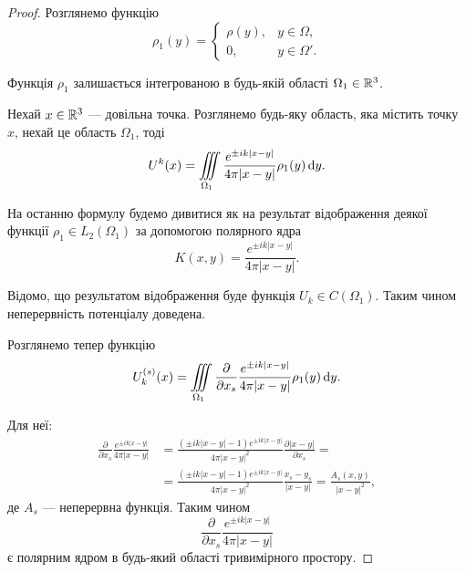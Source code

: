 \begin{proof}
	Розглянемо функцію
	\begin{equation}
		\rho_1(y) = \begin{cases}
			\rho(y), & y \in \Omega, \\
			0, & y \in \Omega'.
		\end{cases}	
	\end{equation}

	Функція $\rho_1$ залишається інтегрованою в будь-якій області $\Omega_1 \in \mathbb{R}^3$. \medskip

	Нехай $x \in \mathbb{R}^3$ --- довільна точка. Розглянемо будь-яку область, яка містить точку $x$, нехай це область $\Omega_1$, тоді
	\begin{equation}
		U^k(x) = \displaystyle\iiint\limits_{\Omega_1} \frac{e^{\pm i k |x - y|}}{4 \pi |x - y|} \rho_1(y) \mathop{}\!\mathrm{d} y.
	\end{equation}

	На останню формулу будемо дивитися як на результат відображення деякої функції $\rho_1 \in L_2(\Omega_1)$ за допомогою полярного ядра
	\begin{equation}
		K(x, y) = \frac{e^{\pm i k |x - y|}}{4 \pi |x - y|}.
	\end{equation}

	Відомо, що результатом відображення буде функція $U_k \in C(\Omega_1)$.  Таким чином неперервність потенціалу доведена. \medskip

	Розглянемо тепер функцію
	\begin{equation}
		U_k^{(s)}(x) = \displaystyle\iiint\limits_{\Omega_1} \frac{\partial}{\partial x_s} \frac{e^{\pm i k |x - y|}}{4 \pi |x - y|} \rho_1(y) \mathop{}\!\mathrm{d} y.
	\end{equation}

	Для неї:
	\begin{equation}
		\begin{aligned}
			\frac{\partial}{\partial x_s} \frac{e^{\pm i k |x - y|}}{4 \pi |x - y|} &= \frac{(\pm i k |x - y| - 1) e^{\pm i k |x - y|}}{4 \pi |x - y|^2} \frac{\partial |x - y|}{\partial x_s} = \\
			&= \frac{(\pm i k |x - y| - 1) e^{\pm i k |x - y|}}{4 \pi |x - y|^2} \frac{x_s - y_s}{|x - y|} = \frac{A_s(x, y)}{|x - y|^2},
		\end{aligned}
	\end{equation} 
	де $A_s$ --- неперервна функція. Таким чином
	\begin{equation}
		\frac{\partial}{\partial x_s} \frac{e^{\pm i k |x - y|}}{4 \pi |x - y|}	
	\end{equation}
	є полярним ядром в будь-який області тривимірного простору. \medskip


\end{proof}
